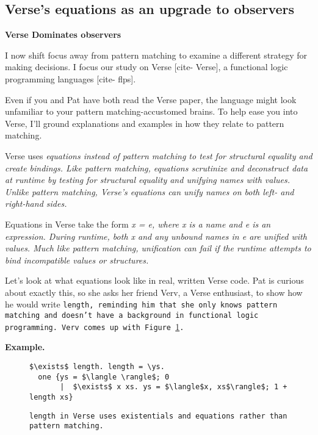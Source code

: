 \documentclass[manuscript,screen,review, 12pt]{acmart}
\begin{document}
\begin{outline}[enumerate]
    \subsection{Verse's equations as an upgrade to observers}
    \label{verseoverobservers}
    
    \1 \bf{Verse Dominates observers }
    
    I now shift focus away from pattern matching to examine a different strategy
    for making decisions. I focus our study on Verse [cite- Verse], a functional
    logic programming languages [cite- flps]. 

    Even if you and Pat have both read the Verse paper, the language might look
    unfamiliar to your pattern matching-accustomed brains. To help ease you into
    Verse, I'll ground explanations and examples in how they relate to pattern
    matching. 

    Verse uses \it{equations} instead of pattern matching to test for structural
    equality and create bindings. Like pattern matching, equations scrutinize
    and deconstruct data at runtime by testing for structural equality and
    unifying names with values. Unlike pattern matching, Verse's equations can
    unify names on both left- \it{and} right-hand sides. 
    
    Equations in Verse take the form \it{x = e}, where \it{x} is a name and
    \it{e} is an expression. During runtime, both \it{x} and any unbound names
    in \it{e} are unified with values. Much like pattern matching, unification
    can fail if the runtime attempts to bind incompatible values or structures. 

    Let's look at what equations look like in real, written Verse code. Pat is
    curious about exactly this, so she asks her friend Verv, a Verse enthusiast,
    to show how he would write \tt{length}, reminding him that she only knows
    pattern matching and doesn't have a background in functional logic
    programming. Verv comes up with Figure~\ref{fig:verselen}. 
    
    \2 \bf{Example.}

    \begin{figure}[h]
        \verselst
        \begin{lstlisting}[numbers=none]
$\exists$ length. length = \ys. 
  one {ys = $\langle \rangle$; 0
       |  $\exists$ x xs. ys = $\langle$x, xs$\rangle$; 1 + length xs}
        \end{lstlisting}
    \caption{\tt{length} in Verse uses existentials and equations rather than
    pattern matching.} 
    \label{fig:verselen}
    \end{figure}


\end{outline}
\end{document}
